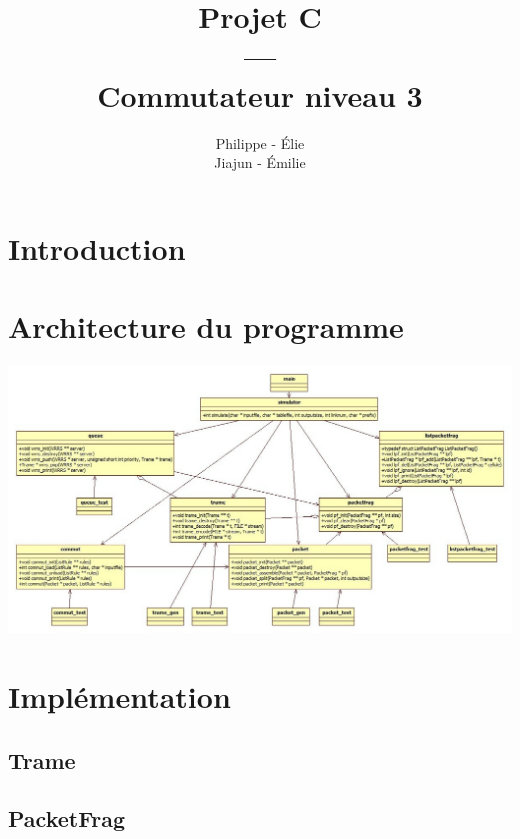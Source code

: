 \documentclass{beamer}
\title{Projet C\\---\\Commutateur niveau 3}
\author{Philippe \bsc{Tran Ba} - Élie \bsc{Bouttier}\\Jiajun \bsc{Shi} - Émilie \bsc{Abia}}
\institute{ENSEEIHT, département TR}
\newcommand{\FSource}[1]{%
  
  }
\begin{document}
\begin{frame}
\titlepage
\end{frame}

\begin{frame}
\tableofcontents
\end{frame}

\section{Introduction}

\section{Architecture du programme}

\begin{frame}
\hspace{-1cm}\includegraphics[scale=0.28]{UML2.jpg}
\end{frame}


\section{Implémentation}

\subsection{Trame}

\frame{\FSource{sources/trame.h}}

\frame{\FSource{sources/automate.c}}

\subsection{PacketFrag}
\end{document}
